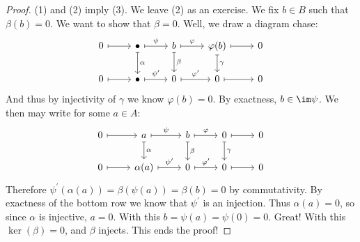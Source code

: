 \begin{proof}
	(1) and (2) imply (3). We leave (2) as an exercise. We fix $b \in B$ such that $\beta(b) = 0$. We want to show that $\beta = 0$. Well, we draw a diagram chase:
	\[\begin{tikzcd}
			0 & {\bullet } & b & {\varphi(b)} & 0 \\
			0 & {\bullet } & 0 & 0 & 0
			\arrow[maps to, from=1-1, to=1-2]
			\arrow["\psi", maps to, from=1-2, to=1-3]
			\arrow["\varphi", maps to, from=1-3, to=1-4]
			\arrow[maps to, from=1-4, to=1-5]
			\arrow["\gamma", maps to, from=1-4, to=2-4]
			\arrow[maps to, from=2-4, to=2-5]
			\arrow["{\varphi^\prime}", maps to, from=2-3, to=2-4]
			\arrow["\beta", maps to, from=1-3, to=2-3]
			\arrow["{\psi^\prime}", maps to, from=2-2, to=2-3]
			\arrow["\alpha", maps to, from=1-2, to=2-2]
			\arrow[maps to, from=2-1, to=2-2]
		\end{tikzcd}\]
	And thus by injectivity of $\gamma$ we know $\varphi(b) = 0$. By exactness, $b \in \im \psi$. We then may write for some $a \in A$:
	\[\begin{tikzcd}
			0 & a & b & 0 & 0 \\
			0 & {\alpha(a)} & 0 & 0 & 0
			\arrow[maps to, from=1-1, to=1-2]
			\arrow["\varphi", maps to, from=1-3, to=1-4]
			\arrow[maps to, from=1-4, to=1-5]
			\arrow["\gamma", maps to, from=1-4, to=2-4]
			\arrow[maps to, from=2-4, to=2-5]
			\arrow["{\varphi^\prime}", maps to, from=2-3, to=2-4]
			\arrow["\beta", maps to, from=1-3, to=2-3]
			\arrow["{\psi^\prime}", maps to, from=2-2, to=2-3]
			\arrow["\alpha", maps to, from=1-2, to=2-2]
			\arrow[maps to, from=2-1, to=2-2]
			\arrow["\psi", maps to, from=1-2, to=1-3]
		\end{tikzcd}\]
	Therefore $\psi^\prime (\alpha(a)) = \beta(\psi(a)) = \beta(b) = 0$ by commutativity. By exactness of the bottom row we know that $\psi^\prime $ is an injection.
	Thus $\alpha(a) = 0$, so since $\alpha$ is injective, $a = 0$. With this $b = \psi(a) = \psi(0) = 0$. Great! With this $\ker(\beta) = 0$, and $\beta$ injects. This ends the proof!
\end{proof}
